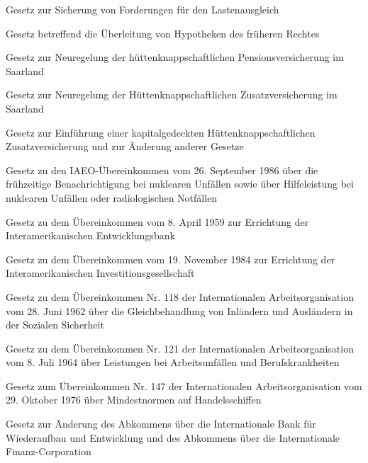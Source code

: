 \item[{HypSichG}] Gesetz zur Sicherung von Forderungen für den Lastenausgleich

\item[{HypÜberlG}] Gesetz betreffend die Überleitung von Hypotheken des früheren Rechtes

\item[{HZvG}] Gesetz zur Neuregelung der hüttenknappschaftlichen Pensionsversicherung im Saarland

\item[{HZvG-2002}] Gesetz zur Neuregelung der Hüttenknappschaftlichen Zusatzversicherung im Saarland

\item[{HZvNG}] Gesetz zur Einführung einer kapitalgedeckten Hüttenknappschaftlichen Zusatzversicherung und zur Änderung anderer Gesetze

\item[{IAEOBen-IAEOHiLÜbkG}] Gesetz zu den IAEO-Übereinkommen vom 26. September 1986 über die frühzeitige Benachrichtigung bei nuklearen Unfällen sowie über Hilfeleistung bei nuklearen Unfällen oder radiologischen Notfällen

\item[{IAmEntwBkÜbkG}] Gesetz zu dem Übereinkommen vom 8. April 1959 zur Errichtung der Interamerikanischen Entwicklungsbank

\item[{IAmInvGesÜbkUSA-uaG}] Gesetz zu dem Übereinkommen vom 19. November 1984 zur Errichtung der Interamerikanischen Investitionsgesellschaft

\item[{IAOÜbk118G}] Gesetz zu dem Übereinkommen Nr. 118 der Internationalen Arbeitsorganisation vom 28. Juni 1962 über die Gleichbehandlung von Inländern und Ausländern in der Sozialen Sicherheit

\item[{IAOÜbk121G}] Gesetz zu dem Übereinkommen Nr. 121 der Internationalen Arbeitsorganisation vom 8. Juli 1964 über Leistungen bei Arbeitsunfällen und Berufskrankheiten

\item[{IAOÜbk147G}] Gesetz zum Übereinkommen Nr. 147 der Internationalen Arbeitsorganisation vom 29. Oktober 1976 über Mindestnormen auf Handelsschiffen

\item[{IBRD-IFCAbkÄndG}] Gesetz zur Änderung des Abkommens über die Internationale Bank für Wiederaufbau und Entwicklung und des Abkommens über die Internationale Finanz-Corporation

